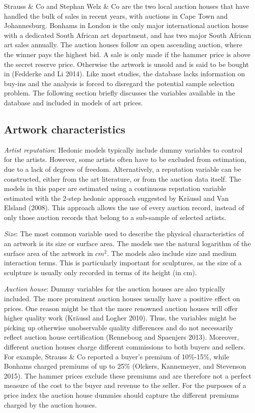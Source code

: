 \documentclass[]{elsarticle} %
\begin{document}
Strauss \& Co and Stephan Welz \& Co are the two local auction houses
that have handled the bulk of sales in recent years, with auctions in
Cape Town and Johannesburg. Bonhams in London is the only major
international auction house with a dedicated South African art
department, and has two major South African art sales annually. The
auction houses follow an open ascending auction, where the winner pays
the highest bid. A sale is only made if the hammer price is above the
secret reserve price. Otherwise the artwork is unsold and is said to be
bought in (Fedderke and Li 2014). Like most studies, the database lacks
information on buy-ins and the analysis is forced to disregard the
potential sample selection problem. The following section briefly
discusses the variables available in the database and included in models
of art prices.

\subsection{Artwork characteristics}\label{artwork-characteristics}

\emph{Artist reputation}: Hedonic models typically include dummy
variables to control for the artists. However, some artists often have
to be excluded from estimation, due to a lack of degrees of freedom.
Alternatively, a reputation variable can be constructed, either from the
art literature, or from the auction data itself. The models in this
paper are estimated using a continuous reputation variable estimated
with the 2-step hedonic approach suggested by Kräussl and Van Elsland
(2008). This approach allows the use of every auction record, instead of
only those auction records that belong to a sub-sample of selected
artists.

\emph{Size}: The most common variable used to describe the physical
characteristics of an artwork is its size or surface area. The models
use the natural logarithm of the surface area of the artwork in
\(cm^2\). The models also include size and medium interaction terms.
This is particularly important for sculptures, as the size of a
sculpture is usually only recorded in terms of its height (in cm).

\emph{Auction house}: Dummy variables for the auction houses are also
typically included. The more prominent auction houses usually have a
positive effect on prices. One reason might be that the more renowned
auction houses will offer higher quality work (Kräussl and Logher 2010).
Thus, the variables might be picking up otherwise unobservable quality
differences and do not necessarily reflect auction house certification
(Renneboog and Spaenjers 2013). Moreover, different auction houses
charge different commissions to both buyers and sellers. For example,
Strauss \& Co reported a buyer's premium of 10\%-15\%, while Bonhams
charged premiums of up to 25\% (Olckers, Kannemeyer, and Stevenson
2015). The hammer prices exclude these premiums and are therefore not a
perfect measure of the cost to the buyer and revenue to the seller. For
the purposes of a price index the auction house dummies should capture
the different premiums charged by the auction houses.
\end{document}
